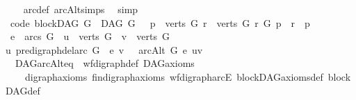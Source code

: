 \begin{isabellebody}
%
\isadelimproof
\ \ %
\endisadelimproof
%
\isatagproof
{}\isamarkupfalse%
\ arc{\isacharunderscore}{\kern0pt}def\ arcAlt{\isachardot}{\kern0pt}simps\ \isamarkupfalse%
\ simp%
\endisatagproof
{\isafoldproof}%
%
\isadelimproof
\isanewline
%
\endisadelimproof
\ \ \isanewline
{}\isamarkupfalse%
\ {\isacharbrackleft}{\kern0pt}code{\isacharbrackright}{\kern0pt}{\isacharcolon}{\kern0pt}\ {\isachardoublequoteopen}blockDAG\ G\ {\isacharequal}{\kern0pt}\ {\isacharparenleft}{\kern0pt}DAG\ G\ {\isasymand}\ {\isacharparenleft}{\kern0pt}{\isacharparenleft}{\kern0pt}{\isasymexists}\ p\ {\isasymin}\ verts\ G{\isachardot}{\kern0pt}\ {\isacharparenleft}{\kern0pt}{\isacharparenleft}{\kern0pt}{\isasymforall}r\ {\isasymin}\ verts\ G{\isachardot}{\kern0pt}\ {\isacharparenleft}{\kern0pt}r\ {\isasymrightarrow}\isactrlsup {\isacharplus}{\kern0pt}\isactrlbsub G\isactrlesub \ p\ {\isasymor}\ r\ {\isacharequal}{\kern0pt}\ p{\isacharparenright}{\kern0pt}{\isacharparenright}{\kern0pt}{\isacharparenright}{\kern0pt}{\isacharparenright}{\kern0pt}\ {\isasymand}\isanewline
\ {\isacharparenleft}{\kern0pt}{\isasymforall}e\ {\isasymin}\ {\isacharparenleft}{\kern0pt}arcs\ G{\isacharparenright}{\kern0pt}{\isachardot}{\kern0pt}\ {\isasymforall}\ u\ {\isasymin}\ verts\ G{\isachardot}{\kern0pt}\ {\isasymforall}\ v\ {\isasymin}\ verts\ G{\isachardot}{\kern0pt}\ \isanewline
{\isacharparenleft}{\kern0pt}u\ {\isasymrightarrow}\isactrlsup {\isacharplus}{\kern0pt}\isactrlbsub {\isacharparenleft}{\kern0pt}pre{\isacharunderscore}{\kern0pt}digraph{\isachardot}{\kern0pt}del{\isacharunderscore}{\kern0pt}arc\ G\ \ e{\isacharparenright}{\kern0pt}\isactrlesub \ v{\isacharparenright}{\kern0pt}\ {\isasymlongrightarrow}\ {\isasymnot}\ arcAlt\ G\ e\ {\isacharparenleft}{\kern0pt}u{\isacharcomma}{\kern0pt}v{\isacharparenright}{\kern0pt}{\isacharparenright}{\kern0pt}{\isacharparenright}{\kern0pt}{\isacharparenright}{\kern0pt}{\isachardoublequoteclose}\ \isanewline
%
\isadelimproof
\ \ %
\endisadelimproof
%
\isatagproof
{}\isamarkupfalse%
\ \ DAG{\isachardot}{\kern0pt}arcAlt{\isacharunderscore}{\kern0pt}eq\ \ wf{\isacharunderscore}{\kern0pt}digraph{\isacharunderscore}{\kern0pt}def\ DAG{\isachardot}{\kern0pt}axioms{\isacharparenleft}{\kern0pt}{}{\isacharparenright}{\kern0pt}\isanewline
\ \ \ \ digraph{\isachardot}{\kern0pt}axioms{\isacharparenleft}{\kern0pt}{}{\isacharparenright}{\kern0pt}\ fin{\isacharunderscore}{\kern0pt}digraph{\isachardot}{\kern0pt}axioms{\isacharparenleft}{\kern0pt}{}{\isacharparenright}{\kern0pt}\ wf{\isacharunderscore}{\kern0pt}digraph{\isachardot}{\kern0pt}arcE\ blockDAG{\isacharunderscore}{\kern0pt}axioms{\isacharunderscore}{\kern0pt}def\ blockDAG{\isacharunderscore}{\kern0pt}def\ \isanewline

\end{isabellebody}
